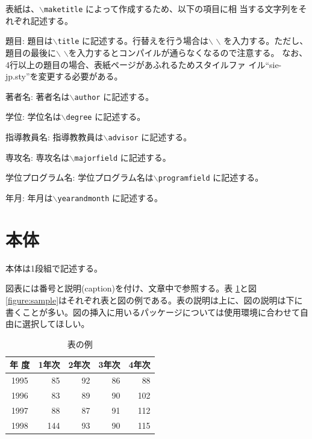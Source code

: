 \documentclass[a4paper,11pt,dvipdfmx]{ujreport}
\begin{document}
表紙は、{\tt $\backslash$maketitle} によって作成するため、以下の項目に相
当する文字列をそれぞれ記述する。

\begin{description} \parskip=1pt
\item{題目: }
題目は{\tt $\backslash$title} に記述する。行替えを行う場合は$\backslash$	   $\backslash$ を入力する。ただし、題目の最後に$\backslash$ $\backslash$を入力するとコンパイルが通らなくなるので注意する。
なお、4行以上の題目の場合、表紙ページがあふれるためスタイルファ	   イル``sie-jp.sty''を変更する必要がある。
\item{著者名: }
著者名は{\tt $\backslash$author} に記述する。
\item{学位: }
学位名は{\tt $\backslash$degree} に記述する。
\item{指導教員名: }
指導教教員は{\tt $\backslash$advisor} に記述する。
\item{専攻名: }
専攻名は{\tt $\backslash$majorfield} に記述する。
\item{学位プログラム名: }
学位プログラム名は{\tt $\backslash$programfield} に記述する。
\item{年月: }
年月は{\tt $\backslash$yearandmonth} に記述する。
\end{description}

\section{本体}

本体は1段組で記述する。

図表には番号と説明(caption)を付け、文章中で参照する。表
\ref{table:fundamental_data_type}と図\ref{figure:sample}はそれぞれ表と図の例である。表の説明は上に、図の説明は下に書くことが多い。図の挿入に用いるパッケージについては使用環境に合わせて自由に選択してほしい。

\begin{table}[hbt]
\centering
\caption{表の例}
\label{table:fundamental_data_type}
\begin{tabular}{| c | r | r | r | r |}
\hline
年 度 & 1年次 & 2年次 & 3年次 & 4年次 \\
\hline
1995 & 85 & 92 & 86 & 88 \\
1996 & 83 & 89 & 90 & 102 \\
1997 & 88 & 87 & 91 & 112 \\
1998 & 144 & 93 & 90 & 115 \\
\hline 
\end{tabular}
\end{table}
\medskip
\end{document}
